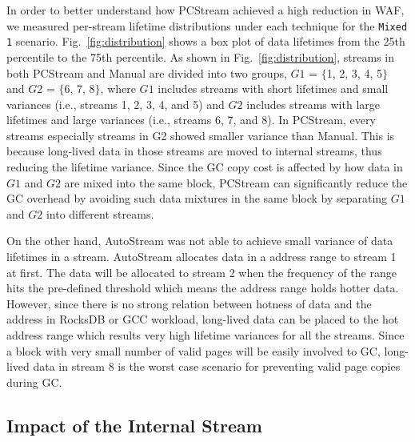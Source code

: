 In order to better understand how \textsf{\small PCStream} achieved a high reduction in WAF, 
we measured per-stream lifetime distributions under each 
technique for the \texttt{Mixed 1} scenario.
Fig.~\ref{fig:distribution} shows a box plot of data lifetimes from the 
25th percentile to the 75th percentile.
As shown in Fig.~\ref{fig:distribution}, 
streams in both \textsf{\small PCStream} and Manual are divided into two groups, 
$G1$ = $\{$1, 2, 3, 4, 5$\}$ and $G2$ = $\{$6, 7, 8$\}$, 
where $G1$ includes streams with short lifetimes and small variances 
(i.e., streams 1, 2, 3, 4, and 5) 
and $G2$ includes streams with large lifetimes and large variances (i.e., streams 6, 7, and 8).  
In PCStream, every streams especially streams in G2 showed smaller variance than 
Manual.
This is because long-lived data in those streams are moved to internal streams, thus 
reducing the lifetime variance.
Since the GC copy cost is affected by how data in $G1$ and $G2$ are mixed into the same block, 
\textsf{\small PCStream} can significantly reduce the GC overhead 
by avoiding such data mixtures in the same block by separating $G1$ and $G2$ into different streams. 

On the other hand, AutoStream was not able to achieve small variance of data lifetimes in a stream.
AutoStream allocates data in a address range to stream 1 at first.
The data will be allocated to stream 2 when the frequency of the range hits the 
pre-defined threshold which means the address range holds hotter data.
However, since there is no strong relation between hotness of data and the address in RocksDB
or GCC workload, 
long-lived data can be placed to the hot address range which results 
very high lifetime variances for all the streams.
Since a block with very small number of valid pages will be easily involved to GC,
long-lived data in stream 8 is the worst case scenario 
for preventing valid page copies during GC.

\subsection{Impact of the Internal Stream}

